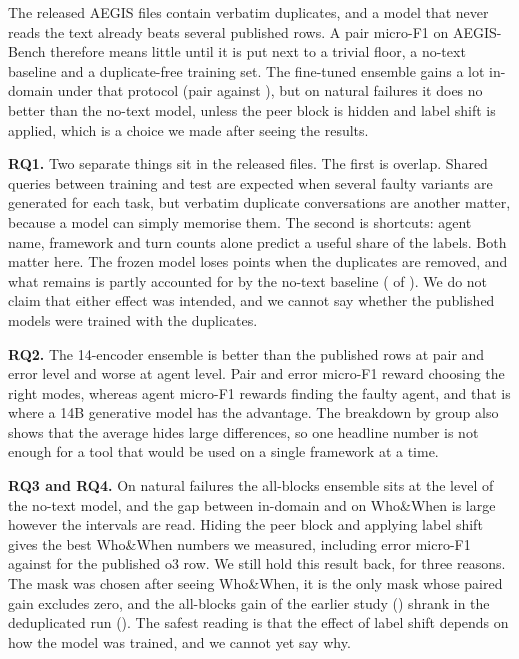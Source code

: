 \documentclass[conference]{IEEEtran}
\begin{document}
The released AEGIS files contain verbatim duplicates, and a model that never reads the text already beats several published rows. A pair micro-F1 on AEGIS-Bench therefore means little until it is put next to a trivial floor, a no-text baseline and a duplicate-free training set. The fine-tuned ensemble gains a lot in-domain under that protocol (pair \ensAEpair{} against \pubSFT{}), but on natural failures it does no better than the no-text model, unless the peer block is hidden and label shift is applied, which is a choice we made after seeing the results.

\textbf{RQ1.} Two separate things sit in the released files. The first is overlap. Shared queries between training and test are expected when several faulty variants are generated for each task, but verbatim duplicate conversations are another matter, because a model can simply memorise them. The second is shortcuts: agent name, framework and turn counts alone predict a useful share of the labels. Both matter here. The frozen model loses \dropAE{} points when the duplicates are removed, and what remains is partly accounted for by the no-text baseline (\shortAEpair{} of \fullAEdedup). We do not claim that either effect was intended, and we cannot say whether the published models were trained with the duplicates.

\textbf{RQ2.} The 14-encoder ensemble is better than the published rows at pair and error level and worse at agent level. Pair and error micro-F1 reward choosing the right modes, whereas agent micro-F1 rewards finding the faulty agent, and that is where a 14B generative model has the advantage. The breakdown by group also shows that the average hides large differences, so one headline number is not enough for a tool that would be used on a single framework at a time.

\textbf{RQ3 and RQ4.} On natural failures the all-blocks ensemble sits at the level of the no-text model, and the gap between \ensAEpair{} in-domain and \wwAllNo{} on Who\&When is large however the intervals are read. Hiding the peer block and applying label shift gives the best Who\&When numbers we measured, including \wwNameShiftErr{} error micro-F1 against \pubOthreeWWerr{} for the published o3 row. We still hold this result back, for three reasons. The mask was chosen after seeing Who\&When, it is the only mask whose paired gain excludes zero, and the all-blocks gain of the earlier study (\sgOldOO{}) shrank in the deduplicated run (\sgDdOO{}). The safest reading is that the effect of label shift depends on how the model was trained, and we cannot yet say why.
\end{document}
